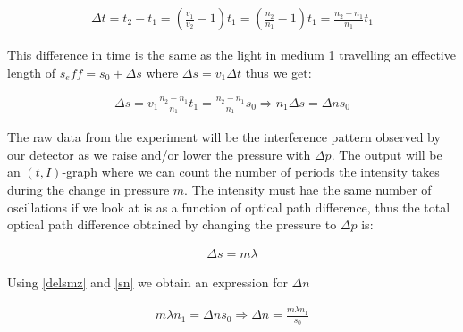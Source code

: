 \begin{align}
\Delta t = t_2-t_1 = (\frac{v_1}{v_2}-1)t_1 = (\frac{n_2}{n_1}-1)t_1=\frac{n_2-n_1}{n_1}t_1
\label{deltat}
\end{align}

This difference in time is the same as the light in medium 1 travelling an effective length of $s_eff=s_0+\Delta s$ where $\Delta s = v_1 \Delta t$ thus we get:

\begin{align}
\Delta s = v_1\frac{n_2-n_1}{n_1}t_1=\frac{n_2-n_1}{n_1}s_0 \Rightarrow n_1\Delta s = \Delta n s_0
\label{sn}
\end{align}

The raw data from the experiment will be the interference pattern observed by our detector as we raise and/or lower the pressure with $\Delta p$. The output will be an $(t,I)$-graph where we can count the number of periods the intensity takes during the change in pressure $m$. The intensity must hae the same number of oscillations if we look at is as a function of optical path difference, thus the total optical path difference obtained by changing the pressure to $\Delta p$ is:

\begin{align}
\Delta s = m\lambda
\label{delsmz}
\end{align}

Using \ref{delsmz} and \ref{sn} we obtain an expression for $\Delta n$

\begin{align}
m\lambda n_1 = \Delta n s_0 \Rightarrow \Delta n = \frac{m \lambda n_1}{s_0}
\label{deln}
\end{align}



